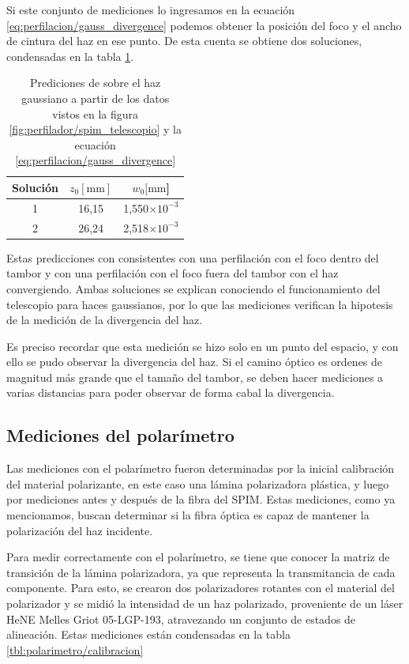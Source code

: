 Si este conjunto de mediciones lo ingresamos en la ecuación \ref{eq:perfilacion/gauss_divergence} podemos obtener la posición del foco y el ancho de cintura del haz en ese punto. De esta cuenta se obtiene dos soluciones, condensadas en la tabla \ref{tbl:perfilador/spim_telescopio_predicciones}.

\begin{table}[H]
        \centering
        \begin{tabular}{c|c|c}
            Solución & $z_0[\text{mm}]$ & $w_0[\text{mm}$] \\ \hline
            1 &  16,15 &  1,550$\times10^{-3}$  \\
            2 &  26,24 &  2,518$\times10^{-3}$\\
        \end{tabular}
        \caption{Prediciones de sobre el haz gaussiano a partir de los datos vistos en la figura \ref{fig:perfilador/spim_telescopio} y la ecuación \ref{eq:perfilacion/gauss_divergence}}
        \label{tbl:perfilador/spim_telescopio_predicciones}
\end{table}

Estas predicciones con consistentes con una perfilación con el foco dentro del tambor y con una perfilación con el foco fuera del tambor con el haz convergiendo. Ambas soluciones se explican conociendo el funcionamiento del telescopio para haces gaussianos, por lo que las mediciones verifican la hipotesis de la medición de la divergencia del haz.

Es preciso recordar que esta medición se hizo solo en un punto del espacio, y con ello se pudo observar la divergencia del haz. Si el camino óptico es ordenes de magnitud más grande que el tamaño del tambor, se deben hacer mediciones a varias distancias para poder observar de forma cabal la divergencia.

\subsection{Mediciones del polarímetro}

Las mediciones con el polarímetro fueron determinadas por la inicial calibración del material polarizante, en este caso una lámina polarizadora plástica, y luego por mediciones antes y después de la fibra del SPIM. Estas mediciones, como ya mencionamos, buscan determinar si la fibra óptica es capaz de mantener la polarización del haz incidente.

Para medir correctamente con el polarímetro, se tiene que conocer la matriz de transición de la lámina polarizadora, ya que representa la transmitancia de cada componente. Para esto, se crearon dos polarizadores rotantes con el material del polarizador y se midió la intensidad de un haz polarizado, proveniente de un láser HeNE Melles Griot 05-LGP-193, atravezando un conjunto de estados de alineación. Estas mediciones están condensadas en la tabla \ref{tbl:polarimetro/calibracion}


